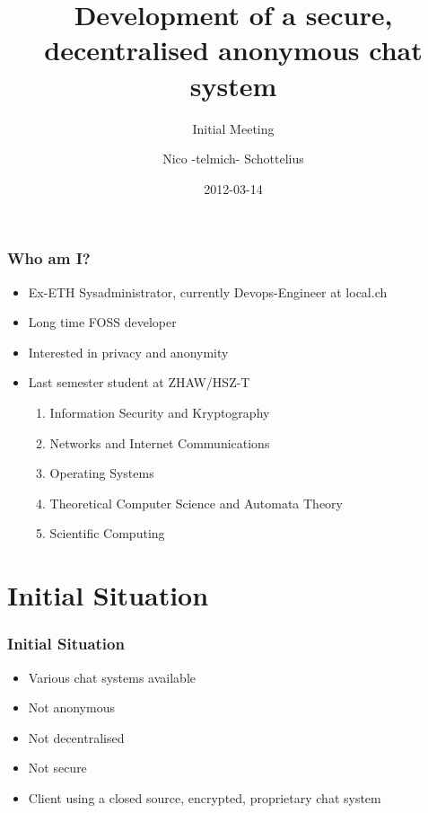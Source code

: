 \documentclass{beamer}
\title{Development of a secure, decentralised anonymous chat system}
\subtitle{Initial Meeting}
\author{Nico -telmich- Schottelius}
\date{2012-03-14}
\begin{document}
\frame{\titlepage}

\frame{\tableofcontents}

\frame
{
  \frametitle{Who am I?}
  \begin{itemize}
  \item Ex-ETH Sysadministrator, currently Devops-Engineer at local.ch
  \item Long time FOSS developer 
  \item Interested in privacy and anonymity
  \item Last semester student at ZHAW/HSZ-T
  \begin{enumerate}
      \item  Information Security and Kryptography
      \item  Networks and Internet Communications
      \item  Operating Systems
      \item  Theoretical Computer Science and Automata Theory
      \item  Scientific Computing
  \end{enumerate}
  \end{itemize}
}

\section{Initial Situation}

\frame
{
  \frametitle{Initial Situation}
  \begin{itemize}
      \item Various chat systems available
      \item Not anonymous
      \item Not decentralised
      \item Not secure
      \item Client using a closed source, encrypted, proprietary chat system
  \end{itemize}
}
\end{document}
